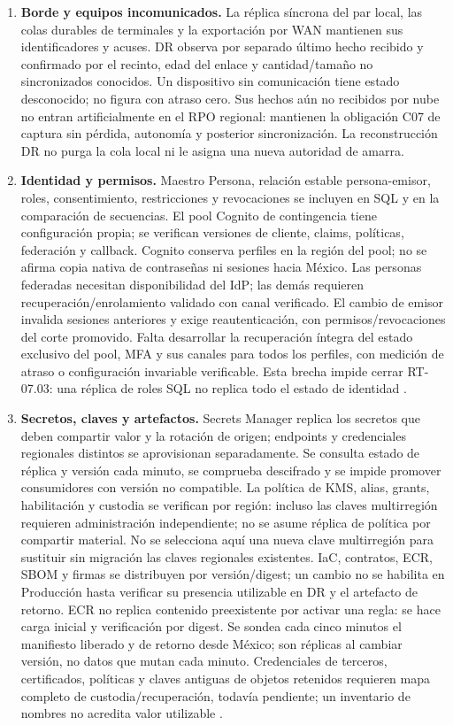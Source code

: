 \begin{enumerate}
\item \textbf{Borde y equipos incomunicados.} La réplica síncrona del par local, las colas durables de terminales y la exportación por WAN mantienen sus identificadores y acuses. DR observa por separado último hecho recibido y confirmado por el recinto, edad del enlace y cantidad/tamaño no sincronizados conocidos. Un dispositivo sin comunicación tiene estado desconocido; no figura con atraso cero. Sus hechos aún no recibidos por nube no entran artificialmente en el RPO regional: mantienen la obligación C07 de captura sin pérdida, autonomía y posterior sincronización. La reconstrucción DR no purga la cola local ni le asigna una nueva autoridad de amarra.
\item \textbf{Identidad y permisos.} Maestro Persona, relación estable persona-emisor, roles, consentimiento, restricciones y revocaciones se incluyen en SQL y en la comparación de secuencias. El pool Cognito de contingencia tiene configuración propia; se verifican versiones de cliente, claims, políticas, federación y callback. Cognito conserva perfiles en la región del pool; no se afirma copia nativa de contraseñas ni sesiones hacia México. Las personas federadas necesitan disponibilidad del IdP; las demás requieren recuperación/enrolamiento validado con canal verificado. El cambio de emisor invalida sesiones anteriores y exige reautenticación, con permisos/revocaciones del corte promovido. Falta desarrollar la recuperación íntegra del estado exclusivo del pool, MFA y sus canales para todos los perfiles, con medición de atraso o configuración invariable verificable. Esta brecha impide cerrar RT-07.03: una réplica de roles SQL no replica todo el estado de identidad \parencite{l14-cognito-region}.
\item \textbf{Secretos, claves y artefactos.} Secrets Manager replica los secretos que deben compartir valor y la rotación de origen; endpoints y credenciales regionales distintos se aprovisionan separadamente. Se consulta estado de réplica y versión cada minuto, se comprueba descifrado y se impide promover consumidores con versión no compatible. La política de KMS, alias, grants, habilitación y custodia se verifican por región: incluso las claves multirregión requieren administración independiente; no se asume réplica de política por compartir material. No se selecciona aquí una nueva clave multirregión para sustituir sin migración las claves regionales existentes. IaC, contratos, ECR, SBOM y firmas se distribuyen por versión/digest; un cambio no se habilita en Producción hasta verificar su presencia utilizable en DR y el artefacto de retorno. ECR no replica contenido preexistente por activar una regla: se hace carga inicial y verificación por digest. Se sondea cada cinco minutos el manifiesto liberado y de retorno desde México; son réplicas al cambiar versión, no datos que mutan cada minuto. Credenciales de terceros, certificados, políticas y claves antiguas de objetos retenidos requieren mapa completo de custodia/recuperación, todavía pendiente; un inventario de nombres no acredita valor utilizable \parencites{l14-secrets-replica,l14-kms-region,l14-ecr-replica}.
\end{enumerate}

